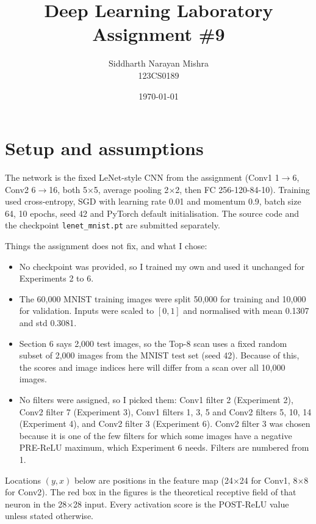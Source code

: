 \documentclass[12pt]{article}
\title{
Deep Learning Laboratory\\
Assignment \#9
}
\author{
Siddharth Narayan Mishra\\
123CS0189
}
\date{\today}
\begin{document}
\maketitle

\tableofcontents

\newpage



\section*{Setup and assumptions}

The network is the fixed LeNet-style CNN from the assignment (Conv1 1$\to$6, Conv2 6$\to$16, both 5$\times$5, average pooling 2$\times$2, then FC 256-120-84-10). Training used cross-entropy, SGD with learning rate 0.01 and momentum 0.9, batch size 64, 10 epochs, seed 42 and PyTorch default initialisation. The source code and the checkpoint \texttt{lenet\_mnist.pt} are submitted separately.

Things the assignment does not fix, and what I chose:
\begin{itemize}
\item No checkpoint was provided, so I trained my own and used it unchanged for Experiments 2 to 6.
\item The 60,000 MNIST training images were split 50,000 for training and 10,000 for validation. Inputs were scaled to $[0,1]$ and normalised with mean 0.1307 and std 0.3081.
\item Section 6 says 2,000 test images, so the Top-8 scan uses a fixed random subset of 2,000 images from the MNIST test set (seed 42). Because of this, the scores and image indices here will differ from a scan over all 10,000 images.
\item No filters were assigned, so I picked them: Conv1 filter 2 (Experiment 2), Conv2 filter 7 (Experiment 3), Conv1 filters 1, 3, 5 and Conv2 filters 5, 10, 14 (Experiment 4), and Conv2 filter 3 (Experiment 6). Conv2 filter 3 was chosen because it is one of the few filters for which some images have a negative PRE-ReLU maximum, which Experiment 6 needs. Filters are numbered from 1.
\end{itemize}

Locations $(y,x)$ below are positions in the feature map (24$\times$24 for Conv1, 8$\times$8 for Conv2). The red box in the figures is the theoretical receptive field of that neuron in the 28$\times$28 input. Every activation score is the POST-ReLU value unless stated otherwise.
\end{document}
